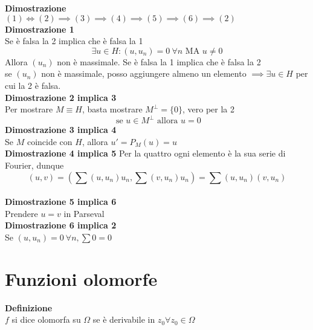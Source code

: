 \textbf{Dimostrazione} 
\\$(1)\iff (2)\implies (3)\implies (4)\implies (5)\implies (6)\implies (2)$
\\\textbf{Dimostrazione 1}
\\Se è falsa la 2 implica che è falsa la 1
\[\exists u\in H:(u,u_n)=0\ \forall n\text{ MA }u\neq 0\]
Allora $(u_n)$ non è massimale.
Se è falsa la 1 implica che è falsa la 2
\\se $(u_n)$ non è massimale, posso aggiungere almeno un elemento $\implies \exists u\in H$ per cui la 2 è falsa.
\\\textbf{Dimostrazione 2 implica 3}
\\Per mostrare $M\equiv H$, basta mostrare $M^\perp=\{0\} $, vero per la 2
\[\text{ se }u\in M^\perp\text{ allora }u=0\]
\textbf{Dimostrazione 3 implica 4} 
\\Se $M$ coincide con $H$, allora $u'=P_M(u)=u$ 
\\\textbf{Dimostrazione 4 implica 5}
Per la quattro ogni elemento è la sua serie di Fourier, dunque
\[(u,v)=(\sum(u,u_n)u_n,\sum(v,u_n)u_n)=\sum(u,u_n)(v,u_n)\]
\\\textbf{Dimostrazione 5 implica 6}
\\Prendere $u=v$ in Parseval
\\\textbf{Dimostrazione 6 implica 2}
\\Se $(u,u_n)=0\ \forall n, \sum0=0$

\section{Funzioni olomorfe}
\begin{tcolorbox}
	\textbf{Definizione} \\
	$f$ si dice olomorfa su $\Omega$ se è derivabile in $z_0\forall z_0\in\Omega$
\end{tcolorbox}
